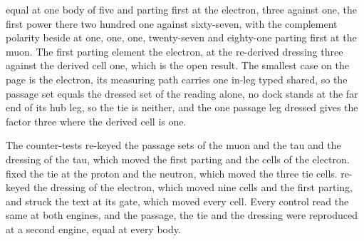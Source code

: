 \begin{chproof}[census]
\begin{equation}
\end{equation}
equal at one body of five and parting first at the electron, three against one, the first power there two hundred one against sixty-seven, with the complement polarity beside at one, one, one, twenty-seven and eighty-one parting first at the muon. The first parting element the electron, at the re-derived dressing three against the derived cell one, which is the open result. The smallest case on the page is the electron, its measuring path carries one in-leg typed shared, so the passage set equals the dressed set of the reading alone, no dock stands at the far end of its hub leg, so the tie is neither, and the one passage leg dressed gives the factor three where the derived cell is one.

The counter-tests re-keyed the passage sets of the muon and the tau and the dressing of the tau, which moved the first parting and the cells of the electron. fixed the tie at the proton and the neutron, which moved the three tie cells. re-keyed the dressing of the electron, which moved nine cells and the first parting, and struck the text at its gate, which moved every cell. Every control read the same at both engines, and the passage, the tie and the dressing were reproduced at a second engine, equal at every body.
\end{chproof}

